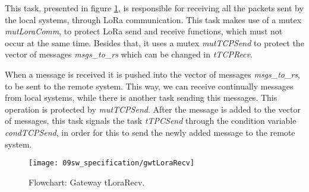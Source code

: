 
This task, presented in figure \ref{fig:gwtLoraRecv}, is responsible for receiving all the packets sent by the local systems, through LoRa communication. This task makes use of a mutex \textit{mutLoraComm}, to protect LoRa send and receive functions, which must not occur at the same time. Besides that, it uses a mutex \textit{mutTCPSend} to protect the vector of messages \textit{msgs\_to\_rs} which can be changed in \textit{tTCPRecv}.

When a message is received it is pushed into the vector of messages \textit{msgs\_to\_rs}, to be sent to the remote system. This way, we can receive continually messages from local systems, while there is another task sending this messages. This operation is protected by \textit{mutTCPSend}. After the message is added to the vector of messages, this task signals the task \textit{tTPCSend} through the condition variable \textit{condTCPSend}, in order for this to send the newly added message to the remote system.

\begin{figure}[H]
	\centering
	\texttt{[image: 09sw\_specification/gwtLoraRecv]}
	\caption{Flowchart: Gateway tLoraRecv.}
	\label{fig:gwtLoraRecv}
\end{figure}

%
%


